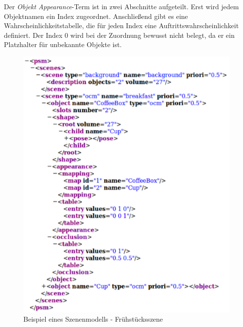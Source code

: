 Der \textit{Objekt Appearance}-Term ist in zwei Abschnitte aufgeteilt. Erst wird jedem Objektnamen ein Index zugeordnet. Anschließend gibt es eine Wahrscheinlichkeitstabelle, die für jeden Index eine Auftrittswahrscheinlichkeit definiert. Der Index 0 wird bei der Zuordnung bewusst nicht belegt, da er ein Platzhalter für unbekannte Objekte ist.
\begin{deprecated}
\cite{gehrung14}
\end{deprecated}
\begin{figure}
	\centering
	\includegraphics[width=15cm]{bilder/Modell.pdf}
	\caption{Beispiel eines Szenenmodells - Frühstücksszene}
	\label{img:modelexample}
\end{figure}
